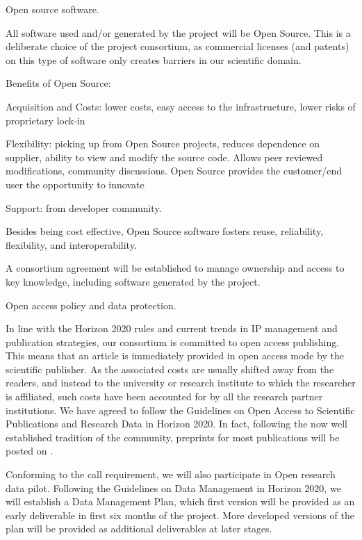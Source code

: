 
Open source software.

All software used and/or generated by the project will be Open Source.
This is a deliberate choice of the project consortium, as commercial
licenses (and patents) on this type of software only creates barriers
in our scientific domain.

Benefits of Open Source:

Acquisition and Costs: lower costs, easy access to the infrastructure,
lower risks of proprietary lock-in

Flexibility: picking up from Open Source projects, reduces dependence on
supplier, ability to view and modify the source code. Allows peer
reviewed modifications, community discussions. Open Source provides the
customer/end user the opportunity to innovate

Support: from developer community.

Besides being cost effective, Open Source software fosters
reuse, reliability, flexibility, and interoperability.

A consortium agreement will be established to manage ownership and
access to key knowledge, including software generated by the project.

Open access policy and data protection.

In line with the Horizon 2020 rules and current trends in IP
management and publication strategies, our consortium is committed to
open access publishing. This means that an article is immediately
provided in open access mode by the scientific publisher. As the
associated costs are usually shifted away from the readers, and
instead to the university or research institute to which the
researcher is affiliated, such costs have been accounted for by all
the research partner institutions. We have agreed to follow the
Guidelines on Open Access to Scientific Publications and Research Data
in Horizon 2020. In fact, following the now well established tradition
of the community, preprints for most publications will be posted on
\Arxiv.

Conforming to the call requirement, we will also participate in Open
research data pilot.  Following the Guidelines on Data Management in
Horizon 2020, we will establish a Data Management Plan, which first
version will be provided as an early deliverable in first six months of
the project. More developed versions of the plan will be provided as
additional deliverables at later stages.

